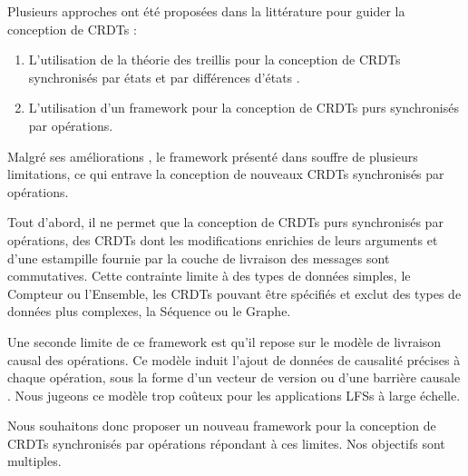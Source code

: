 Plusieurs approches ont été proposées dans la littérature pour guider la conception de \acp{CRDT} :
\begin{enumerate}
    \item L'utilisation de la théorie des treillis pour la conception de \acp{CRDT} synchronisés par états et par différences d'états \cite{shapiro_2011_crdt,enes2019}.
    \item L'utilisation d'un framework \cite{baquero2017pure} pour la conception de \acp{CRDT} purs synchronisés par opérations.
\end{enumerate}

Malgré ses améliorations \cite{2020-flec-bauwens,2021-improving-reactivity-pure-op-based-crdts-bauwens}, le framework présenté dans \cite{baquero2017pure} souffre de plusieurs limitations, ce qui entrave la conception de nouveaux \acp{CRDT} synchronisés par opérations.

Tout d'abord, il ne permet que la conception de \acp{CRDT} purs synchronisés par opérations, \ie des \acp{CRDT} dont les modifications enrichies de leurs arguments et d'une estampille fournie par la couche de livraison des messages sont commutatives.
Cette contrainte limite à des types de données simples, \eg le Compteur ou l'Ensemble, les \acp{CRDT} pouvant être spécifiés et exclut des types de données plus complexes, \eg la Séquence ou le Graphe.

Une seconde limite de ce framework est qu'il repose sur le modèle de livraison causal des opérations.
Ce modèle induit l'ajout de données de causalité précises à chaque opération, sous la forme d'un vecteur de version \cite{1988-version-vector-mattern,1991-version-vector-fidge} ou d'une barrière causale \cite{1997-causal-barrier}.
Nous jugeons ce modèle trop coûteux pour les applications \acp{LFS} à large échelle.

Nous souhaitons donc proposer un nouveau framework pour la conception de \acp{CRDT} synchronisés par opérations répondant à ces limites.
Nos objectifs sont multiples.

